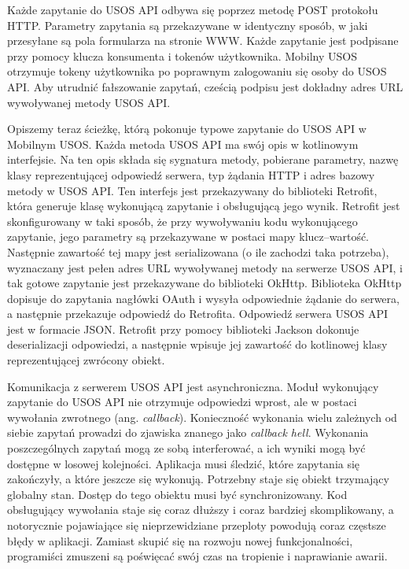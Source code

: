 \documentclass{pracamgr}
\begin{document}
Każde zapytanie do USOS API odbywa się poprzez metodę POST protokołu HTTP.
Parametry zapytania są przekazywane w identyczny sposób, w jaki przesyłane są
pola formularza na stronie WWW. Każde zapytanie jest podpisane przy pomocy klucza
konsumenta i tokenów użytkownika. Mobilny USOS otrzymuje tokeny użytkownika po
poprawnym zalogowaniu się osoby do USOS API. Aby utrudnić fałszowanie zapytań,
cześcią podpisu jest dokładny adres URL wywoływanej metody USOS API.

Opiszemy teraz ścieżkę, którą pokonuje typowe zapytanie do USOS API w Mobilnym USOS.
Każda metoda USOS API ma swój opis w kotlinowym interfejsie. Na ten opis składa
się sygnatura metody, pobierane parametry, nazwę klasy reprezentującej odpowiedź
serwera, typ żądania HTTP i adres bazowy metody w USOS API. Ten interfejs jest
przekazywany do biblioteki Retrofit, która generuje klasę wykonującą zapytanie i
obsługującą jego wynik. Retrofit jest skonfigurowany w taki sposób, że przy
wywoływaniu kodu wykonującego zapytanie, jego parametry są przekazywane w postaci
mapy klucz--wartość. Następnie zawartość tej mapy jest serializowana (o ile zachodzi
taka potrzeba), wyznaczany jest pełen adres URL wywoływanej metody na serwerze USOS
API, i tak gotowe zapytanie jest przekazywane do biblioteki OkHttp. Biblioteka
OkHttp dopisuje do zapytania nagłówki OAuth i wysyła odpowiednie żądanie do serwera,
a następnie przekazuje odpowiedź do Retrofita. Odpowiedź serwera USOS API jest w
formacie JSON. Retrofit przy pomocy biblioteki Jackson dokonuje deserializacji
odpowiedzi, a następnie wpisuje jej zawartość do kotlinowej klasy reprezentującej
zwrócony obiekt.

Komunikacja z serwerem USOS API jest asynchroniczna. Moduł wykonujący zapytanie
do USOS API nie otrzymuje odpowiedzi wprost, ale w postaci wywołania zwrotnego
(ang. \textit{callback}). Konieczność wykonania wielu zależnych od siebie zapytań
prowadzi do zjawiska znanego jako \textit{callback hell}. Wykonania poszczególnych
zapytań mogą ze sobą interferować, a ich wyniki mogą być dostępne w losowej kolejności.
Aplikacja musi śledzić, które zapytania się zakończyły, a które jeszcze się wykonują.
Potrzebny staje się obiekt trzymający globalny stan. Dostęp do tego obiektu musi
być synchronizowany. Kod obsługujący wywołania staje się coraz dłuższy i coraz
bardziej skomplikowany, a notorycznie pojawiające się nieprzewidziane przeploty
powodują coraz częstsze błędy w aplikacji. Zamiast skupić się na rozwoju nowej
funkcjonalności, programiści zmuszeni są poświęcać swój czas na tropienie i
naprawianie awarii.
\end{document}
